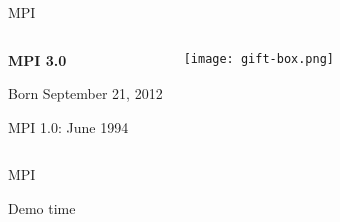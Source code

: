 \documentclass[english,compress]{beamer}
\begin{document}
\begin{frame}{MPI}
  \begin{columns}
      \begin{center}
      \textbf{MPI 3.0}

      \medskip
      Born September 21, 2012

      \vspace{2cm}
      \footnotesize
      MPI 1.0: June 1994
      \end{center}
      \texttt{[image: gift-box.png]}
  \end{columns}
\end{frame}
\begin{frame}{MPI}
  \begin{center}
  \Huge Demo time
  \end{center}
\end{frame}









\questionframe{}
\imagecreditslide
\end{document}
